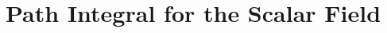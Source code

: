 \documentclass[11pt,twoside]{report}
\begin{document}
\setcounter{chapter}{2}

\chapter{Path Integral for the Scalar Field}
\label{chap:lec2}

\end{document}
